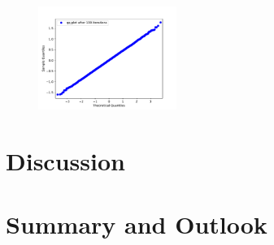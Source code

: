\documentclass{article}
\begin{document}
\begin{figure}[htbp]
		\includegraphics[width=0.4\textwidth]{../imgs/harmonic_oscillator_track/track_10010000_qq_100.pdf}
		\caption{}
	\end{figure}
	\section{Discussion}
	\section{Summary and Outlook}
\end{document}
